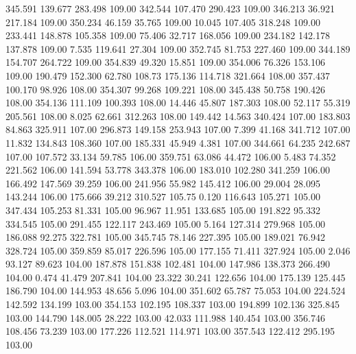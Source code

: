  345.591  139.677  283.498       109.00
 342.544  107.470  290.423       109.00
 346.213   36.921  217.184       109.00
 350.234   46.159   35.765       109.00
  10.045  107.405  318.248       109.00
 233.441  148.878  105.358       109.00
  75.406   32.717  168.056       109.00
 234.182  142.178  137.878       109.00
   7.535  119.641   27.304       109.00
 352.745   81.753  227.460       109.00
 344.189  154.707  264.722       109.00
 354.839   49.320   15.851       109.00
 354.006   76.326  153.106       109.00
 190.479  152.300   62.780       108.73
 175.136  114.718  321.664       108.00
 357.437  100.170   98.926       108.00
 354.307   99.268  109.221       108.00
 345.438   50.758  190.426       108.00
 354.136  111.109  100.393       108.00
  14.446   45.807  187.303       108.00
  52.117   55.319  205.561       108.00
   8.025   62.661  312.263       108.00
 149.442   14.563  340.424       107.00
 183.803   84.863  325.911       107.00
 296.873  149.158  253.943       107.00
   7.399   41.168  341.712       107.00
  11.832  134.843  108.360       107.00
 185.331   45.949    4.381       107.00
 344.661   64.235  242.687       107.00
 107.572   33.134   59.785       106.00
 359.751   63.086   44.472       106.00
   5.483   74.352  221.562       106.00
 141.594   53.778  343.378       106.00
 183.010  102.280  341.259       106.00
 166.492  147.569   39.259       106.00
 241.956   55.982  145.412       106.00
  29.004   28.095  143.244       106.00
 175.666   39.212  310.527       105.75
   0.120  116.643  105.271       105.00
 347.434  105.253   81.331       105.00
  96.967   11.951  133.685       105.00
 191.822   95.332  334.545       105.00
 291.455  122.117  243.469       105.00
   5.164  127.314  279.968       105.00
 186.088   92.275  322.781       105.00
 345.745   78.146  227.395       105.00
 189.021   76.942  328.724       105.00
 359.859   85.017  226.596       105.00
 177.155   71.411  327.924       105.00
   2.046   93.127   89.623       104.00
 187.878  151.838  102.481       104.00
 147.986  138.373  266.490       104.00
   0.474   41.479  207.841       104.00
  23.322   30.241  122.656       104.00
 175.139  125.445  186.790       104.00
 144.953   48.656    5.096       104.00
 351.602   65.787   75.053       104.00
 224.524  142.592  134.199       103.00
 354.153  102.195  108.337       103.00
 194.899  102.136  325.845       103.00
 144.790  148.005   28.222       103.00
  42.033  111.988  140.454       103.00
 356.746  108.456   73.239       103.00
 177.226  112.521  114.971       103.00
 357.543  122.412  295.195       103.00
